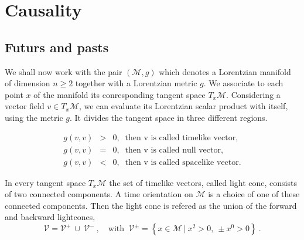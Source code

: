 \documentclass[10pt]{book}
\newcommand{\Mcal}{\mathcal{M}}
\newcommand{\Vcal}{\mathcal{V}}
\theoremstyle{break}
\begin{document}


\section{Causality}


\subsection{Futurs and pasts}

We shall now work with the pair $(\Mcal,g)$ which denotes a Lorentzian manifold of dimension $n \geq 2$ together with a Lorentzian metric $g$. We associate to each point $x$ of the manifold its conresponding tangent space $T_x\Mcal$. Considering a vector field $v \in T_x\Mcal$, we can evaluate its Lorentzian scalar product with itself, using the metric $g$. It divides the tangent space in three different regions.


\begin{eqnarray*}
g(v,v) &>& 0 , \ \mbox{ then v is called timelike vector}, \\ 
g(v,v) &=& 0 , \ \mbox{ then v is called null vector}, \\ 
g(v,v) &<& 0 , \ \mbox{ then v is called spacelike vector}.
\end{eqnarray*}


In every tangent space $T_x\Mcal$ the set of timelike vectors, called light cone, consists of two connected components. A time orientation on $\Mcal$ is a choice of one of these connected components. Then the light cone is refered as the union of the forward and backward lightcones, 
%
\begin{equation*}
\Vcal=\Vcal^{+} \ \cup \ \Vcal^{-} \ , \quad \mbox{with } \ \Vcal^{\pm}=\left\{ x\in\Mcal \ | \ x^{2}>0, \ \pm x^{0}>0 \right\} \ . 
\end{equation*}
\end{document}

